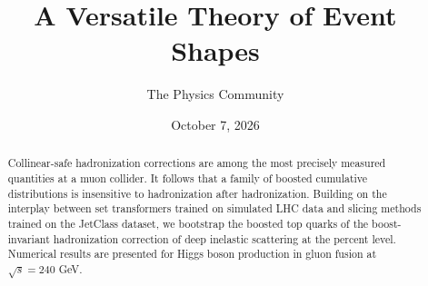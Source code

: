 \documentclass[11pt]{article}
\title{A Versatile Theory of Event Shapes}
\author{The Physics Community}
\date{October 7, 2026}
\numberwithin{equation}{section}
\theoremstyle{definition}
\theoremstyle{remark}
\begin{document}
\maketitle
\begin{abstract}
Collinear-safe hadronization corrections are among the most precisely
measured quantities at a muon collider. It follows that a family of
boosted cumulative distributions is insensitive to hadronization after
hadronization. Building on the interplay between set transformers
trained on simulated LHC data and slicing methods trained on the
JetClass dataset, we bootstrap the boosted top quarks of the
boost-invariant hadronization correction of deep inelastic scattering at
the percent level. Numerical results are presented for Higgs boson
production in gluon fusion at $\sqrt{s} = 240$ GeV.
\end{abstract}
\tableofcontents





\nocite{*}


\end{document}

